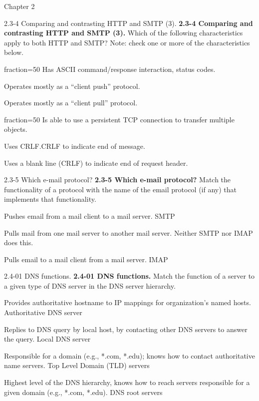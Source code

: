 \documentclass[a4paper]{article}
\begin{document}
\begin{quiz}{Chapter 2}
\begin{multi}[points=1,shuffle,multiple]{2.3-4 Comparing and contrasting HTTP and SMTP (3).}
\textbf{2.3-4 Comparing and contrasting HTTP and SMTP (3).} 
Which of the following characteristics apply to both HTTP and SMTP? 
Note: check one or more of the characteristics below.
\item[fraction=50] Has ASCII command/response interaction, status codes.
\item Operates mostly as a ``client push'' protocol.
\item Operates mostly as a ``client pull'' protocol.
\item[fraction=50] Is able to use a persistent TCP connection to transfer multiple objects.
\item Uses CRLF.CRLF to indicate end of message.
\item Uses a blank line (CRLF) to indicate end of request header.
\end{multi}

\begin{matching}[points=1,shuffle]{2.3-5 Which e-mail protocol?}
\textbf{2.3-5 Which e-mail protocol?}  
Match the functionality of a protocol with the name of the email protocol (if any) that implements that functionality.
\item Pushes email from a mail client to a mail server. \answer SMTP
\item Pulls mail from one mail server to another mail server. \answer Neither SMTP nor IMAP does this.
\item Pulls email to a mail client from a mail server. \answer IMAP
\end{matching}

\begin{matching}[points=1,shuffle]{2.4-01 DNS functions.}
\textbf{2.4-01 DNS functions.} 
Match the function of a server to a given type of DNS server in the  DNS server hierarchy.
\item Provides authoritative hostname to IP mappings for organization's named hosts. \answer Authoritative DNS server
\item Replies to DNS query by local host, by contacting other DNS servers to answer the query. \answer Local DNS server
\item Responsible for a domain (e.g., *.com, *.edu); knows how to contact authoritative name servers. \answer Top Level Domain (TLD) servers
\item Highest level of the DNS hierarchy, knows how to reach servers responsible for a given domain (e.g., *.com, *.edu). \answer DNS root servers
\end{matching}


\end{quiz}
\end{document}
